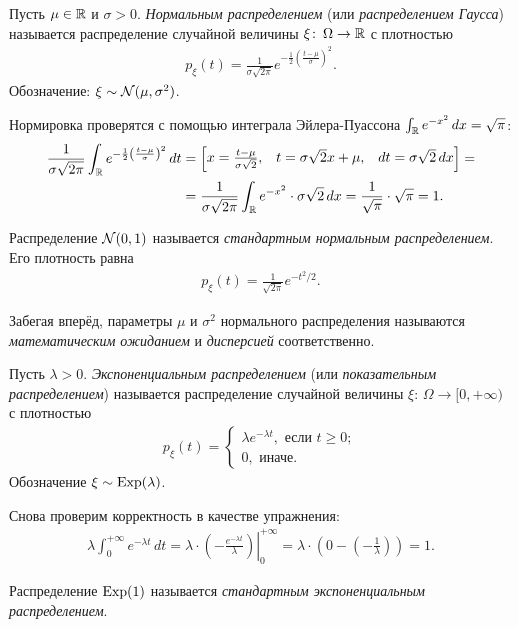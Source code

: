 \documentclass[../main.tex]{subfiles}
\begin{document}
\begin{exmpl}
 Пусть $ \mu\in\mathbb{R} $ и $ \sigma>0 $. \textit{Нормальным распределением} (или \textit{распределением Гаусса}) называется распределение случайной величины $ \xi \colon\,\Omega \to \mathbb{R} $ с плотностью
 \begin{align*}
  p_\xi(t) = \frac{1}{\sigma \sqrt{2\pi}}e^{-\frac{1}{2} \left( \frac{t-\mu}{\sigma} \right)^{2}}.
 \end{align*} Обозначение: $ \xi \sim \mathcal N(\mu,\sigma^{2}) $.

 Нормировка проверятся с помощью интеграла Эйлера-Пуассона $ \int_{\mathbb{R}}  e^{-x^{2}} \,dx = \sqrt \pi $:
 \begin{align*}
  \frac{1}{\sigma \sqrt{2\pi}} \int_\mathbb{R} e^{-\frac{1}{2} \left( \frac{t-\mu}{\sigma} \right)^{2}} \, dt &= \begin{bmatrix}
   x = \frac{t-\mu}{\sigma\sqrt{2}}, & t = \sigma \sqrt 2 x + \mu, & dt = \sigma \sqrt 2 \, dx
  \end{bmatrix} = \\
  &= \frac{1}{\sigma\sqrt{2\pi}} \int_\mathbb{R} e^{-x^{2}} \cdot \sigma\sqrt{2}\,dx = \frac{1}{\sqrt \pi} \cdot \sqrt\pi = 1.
 \end{align*} 

 Распределение $ \mathcal N(0,1) $ называется \textit{стандартным нормальным распределением}. Его плотность равна
 \begin{align*}
  p_\xi(t) = \frac{1}{\sqrt{2\pi}}e^{-t^{2} / 2}.
 \end{align*} 

 Забегая вперёд, параметры $ \mu $ и $ \sigma^{2} $ нормального распределения называются \textit{математическим ожиданием} и \textit{дисперсией} соответственно.
\end{exmpl}
\begin{exmpl}
Пусть $ \lambda > 0 $. \textit{Экспоненциальным распределением} (или \textit{показательным распределением}) называется распределение случайной величины $ \xi \colon\,\Omega\to[0,+\infty) $ с плотностью
\begin{align*}
 p_\xi(t) = \begin{cases}
  \lambda e^{-\lambda t}, \text{ если } t\geqslant 0;  \\
  0, \text{ иначе}.
 \end{cases} 
\end{align*} Обозначение $ \xi \sim \mathrm{Exp}(\lambda) $.

Снова проверим корректность в качестве упражнения:
\begin{align*}
 \lambda \int_{0}^{+\infty} e^{-\lambda t}\,dt = \lambda \cdot \left. \left( -\frac{e^{-\lambda t}}{\lambda} \right)\right|_0^{+\infty} = \lambda \cdot \left( 0 - \left( -\frac{1}{\lambda} \right) \right) = 1.
\end{align*} 

 Распределение $ \mathrm{Exp}(1) $ называется \textit{стандартным экспоненциальным распределением}.
\end{exmpl}
\end{document}
